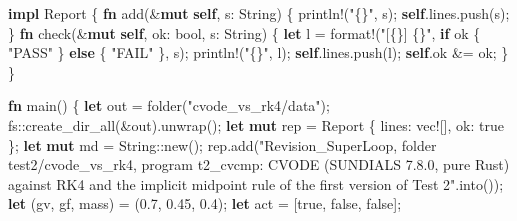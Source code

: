 \documentclass[
  10pt,
]{article}
\newenvironment{Shaded}{}{}
\newcommand{\ConstantTok}[1]{\textcolor[rgb]{0.53,0.00,0.00}{#1}}
\newcommand{\ControlFlowTok}[1]{\textcolor[rgb]{0.00,0.44,0.13}{\textbf{#1}}}
\newcommand{\DataTypeTok}[1]{\textcolor[rgb]{0.56,0.13,0.00}{#1}}
\newcommand{\DecValTok}[1]{\textcolor[rgb]{0.25,0.63,0.44}{#1}}
\newcommand{\KeywordTok}[1]{\textcolor[rgb]{0.00,0.44,0.13}{\textbf{#1}}}
\newcommand{\NormalTok}[1]{#1}
\newcommand{\OperatorTok}[1]{\textcolor[rgb]{0.40,0.40,0.40}{#1}}
\newcommand{\PreprocessorTok}[1]{\textcolor[rgb]{0.74,0.48,0.00}{#1}}
\newcommand{\StringTok}[1]{\textcolor[rgb]{0.25,0.44,0.63}{#1}}
\begin{document}
\begin{Shaded}
\begin{Highlighting}[]
\KeywordTok{impl}\NormalTok{ Report }\OperatorTok{\{}
    \KeywordTok{fn}\NormalTok{ add(}\OperatorTok{\&}\KeywordTok{mut} \KeywordTok{self}\OperatorTok{,}\NormalTok{ s}\OperatorTok{:} \DataTypeTok{String}\NormalTok{) }\OperatorTok{\{}
        \PreprocessorTok{println!}\NormalTok{(}\StringTok{"\{\}"}\OperatorTok{,}\NormalTok{ s)}\OperatorTok{;}
        \KeywordTok{self}\OperatorTok{.}\NormalTok{lines}\OperatorTok{.}\NormalTok{push(s)}\OperatorTok{;}
    \OperatorTok{\}}
    \KeywordTok{fn}\NormalTok{ check(}\OperatorTok{\&}\KeywordTok{mut} \KeywordTok{self}\OperatorTok{,}\NormalTok{ ok}\OperatorTok{:} \DataTypeTok{bool}\OperatorTok{,}\NormalTok{ s}\OperatorTok{:} \DataTypeTok{String}\NormalTok{) }\OperatorTok{\{}
        \KeywordTok{let}\NormalTok{ l }\OperatorTok{=} \PreprocessorTok{format!}\NormalTok{(}\StringTok{"[\{\}] \{\}"}\OperatorTok{,} \ControlFlowTok{if}\NormalTok{ ok }\OperatorTok{\{} \StringTok{"PASS"} \OperatorTok{\}} \ControlFlowTok{else} \OperatorTok{\{} \StringTok{"FAIL"} \OperatorTok{\},}\NormalTok{ s)}\OperatorTok{;}
        \PreprocessorTok{println!}\NormalTok{(}\StringTok{"\{\}"}\OperatorTok{,}\NormalTok{ l)}\OperatorTok{;}
        \KeywordTok{self}\OperatorTok{.}\NormalTok{lines}\OperatorTok{.}\NormalTok{push(l)}\OperatorTok{;}
        \KeywordTok{self}\OperatorTok{.}\NormalTok{ok }\OperatorTok{\&=}\NormalTok{ ok}\OperatorTok{;}
    \OperatorTok{\}}
\OperatorTok{\}}

\KeywordTok{fn}\NormalTok{ main() }\OperatorTok{\{}
    \KeywordTok{let}\NormalTok{ out }\OperatorTok{=}\NormalTok{ folder(}\StringTok{"cvode\_vs\_rk4/data"}\NormalTok{)}\OperatorTok{;}
    \PreprocessorTok{fs::}\NormalTok{create\_dir\_all(}\OperatorTok{\&}\NormalTok{out)}\OperatorTok{.}\NormalTok{unwrap()}\OperatorTok{;}
    \KeywordTok{let} \KeywordTok{mut}\NormalTok{ rep }\OperatorTok{=}\NormalTok{ Report }\OperatorTok{\{}\NormalTok{ lines}\OperatorTok{:} \PreprocessorTok{vec!}\NormalTok{[]}\OperatorTok{,}\NormalTok{ ok}\OperatorTok{:} \ConstantTok{true} \OperatorTok{\};}
    \KeywordTok{let} \KeywordTok{mut}\NormalTok{ md }\OperatorTok{=} \DataTypeTok{String}\PreprocessorTok{::}\NormalTok{new()}\OperatorTok{;}
\NormalTok{    rep}\OperatorTok{.}\NormalTok{add(}\StringTok{"Revision\_SuperLoop, folder test2/cvode\_vs\_rk4, program \textasciigrave{}t2\_cvcmp\textasciigrave{}: CVODE (SUNDIALS 7.8.0, pure Rust) against RK4 and the implicit midpoint rule of the first version of Test 2"}\OperatorTok{.}\NormalTok{into())}\OperatorTok{;}
    \KeywordTok{let}\NormalTok{ (gv}\OperatorTok{,}\NormalTok{ gf}\OperatorTok{,}\NormalTok{ mass) }\OperatorTok{=}\NormalTok{ (}\DecValTok{0.7}\OperatorTok{,} \DecValTok{0.45}\OperatorTok{,} \DecValTok{0.4}\NormalTok{)}\OperatorTok{;}
    \KeywordTok{let}\NormalTok{ act }\OperatorTok{=}\NormalTok{ [}\ConstantTok{true}\OperatorTok{,} \ConstantTok{false}\OperatorTok{,} \ConstantTok{false}\NormalTok{]}\OperatorTok{;}


\end{Highlighting}
\end{Shaded}
\end{document}
